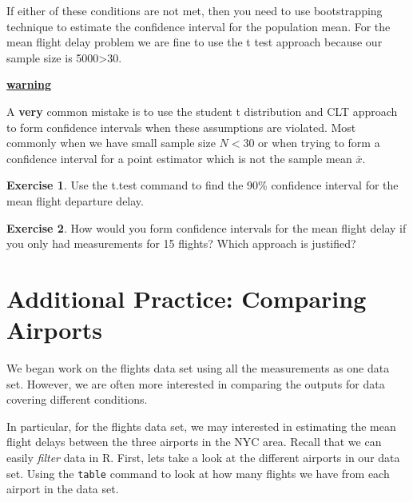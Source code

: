 \documentclass[
]{book}
\newenvironment{Shaded}{\begin{snugshade}}{\end{snugshade}}
\newcommand{\FunctionTok}[1]{\textcolor[rgb]{0.00,0.00,0.00}{#1}}
\newcommand{\NormalTok}[1]{#1}
\newcommand{\SpecialCharTok}[1]{\textcolor[rgb]{0.00,0.00,0.00}{#1}}
\newenvironment{rmdblock}[1]
  {\begin{shaded*}
  \centerline{\underline{\textbf{#1}}}

  }
  {
  \end{shaded*}
  }
\newenvironment{warning}
  {\begin{rmdblock}{warning}}
  {\end{rmdblock}}
\theoremstyle{definition}
\theoremstyle{definition}
\theoremstyle{definition}
\newtheorem{exercise}{Exercise}[chapter]
\theoremstyle{definition}
\theoremstyle{remark}
\begin{document}
If either of these conditions are not met, then you need to use bootstrapping technique to estimate the confidence interval for the population mean. For the mean flight delay problem we are fine to use the t test approach because our sample size is 5000\textgreater30.

\begin{warning}
A \textbf{very} common mistake is to use the student t distribution and CLT approach to form confidence intervals when these assumptions are violated. Most commonly when we have small sample size \(N<30\) or when trying to form a confidence interval for a point estimator which is not the sample mean \(\bar{x}\).
\end{warning}

\begin{exercise}
\protect\hypertarget{exr:unnamed-chunk-383}{}\label{exr:unnamed-chunk-383}Use the t.test command to find the 90\% confidence interval for the mean flight departure delay.
\end{exercise}

\begin{exercise}
\protect\hypertarget{exr:unnamed-chunk-384}{}\label{exr:unnamed-chunk-384}How would you form confidence intervals for the mean flight delay if you only had measurements for 15 flights? Which approach is justified?
\end{exercise}

\hypertarget{additional-practice-comparing-airports}{%
\section{Additional Practice: Comparing Airports}\label{additional-practice-comparing-airports}}

We began work on the flights data set using all the measurements as one data set. However, we are often more interested in comparing the outputs for data covering different conditions.

In particular, for the flights data set, we may interested in estimating the mean flight delays between the three airports in the NYC area. Recall that we can easily \emph{filter} data in R. First, lets take a look at the different airports in our data set. Using the \texttt{table} command to look at how many flights we have from each airport in the data set.

\begin{Shaded}
\end{Shaded}
\end{document}
